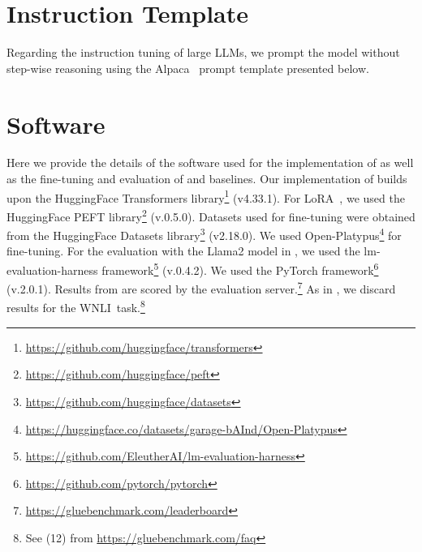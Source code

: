 


\appendix



























\section{Instruction Template}\label{app:instruct}
Regarding the instruction tuning of large LLMs, we prompt the model without step-wise reasoning using the Alpaca~\citep{alpaca} prompt template presented below.

\vspace{0.5em}
\noindent
{}
\section{Software}\label{sec:app:software}
Here we provide the details of the software used for the implementation of \method 
as well as the fine-tuning and evaluation of \method and baselines.
Our implementation of \method builds upon the HuggingFace Transformers library\footnote{\url{https://github.com/huggingface/transformers}} (v4.33.1).
For LoRA~\citep{hu_22}, we used the HuggingFace PEFT library\footnote{\url{https://github.com/huggingface/peft}} (v.0.5.0).
Datasets used for fine-tuning were obtained from the HuggingFace Datasets library\footnote{\url{https://github.com/huggingface/datasets}} (v2.18.0).
We used Open-Platypus\footnote{\url{https://huggingface.co/datasets/garage-bAInd/Open-Platypus}} for fine-tuning.
For the evaluation with the Llama2 model in ,
we used the lm-evaluation-harness framework\footnote{\url{https://github.com/EleutherAI/lm-evaluation-harness}} (v.0.4.2).
We used the PyTorch framework\footnote{\url{https://github.com/pytorch/pytorch}} (v.2.0.1). Results from  are scored by the evaluation server.\footnote{\url{https://gluebenchmark.com/leaderboard}} As in \citet{devlin_19}, we discard results for the WNLI~task.\footnote{See (12) from \url{https://gluebenchmark.com/faq}}

